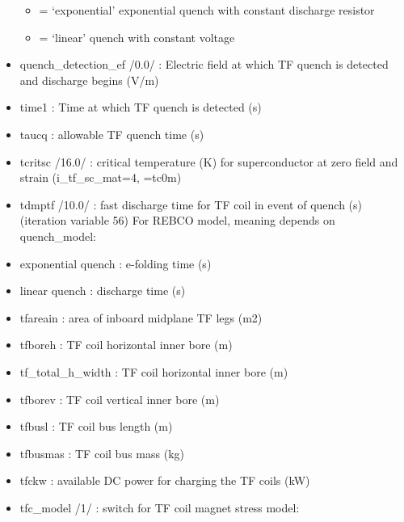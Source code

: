 \documentclass[]{article}
\providecommand{\tightlist}{%
  \setlength{\itemsep}{0pt}\setlength{\parskip}{0pt}}
\begin{document}
\begin{itemize}
  \begin{itemize}
  \tightlist
  \item
    = `exponential' exponential quench with constant discharge resistor
  \item
    = `linear' quench with constant voltage
  \end{itemize}
\item
  quench\_detection\_ef /0.0/ : Electric field at which TF quench is
  detected and discharge begins (V/m)
\item
  time1 : Time at which TF quench is detected (s)
\item
  taucq : allowable TF quench time (s)
\item
  tcritsc /16.0/ : critical temperature (K) for superconductor at zero
  field and strain (i\_tf\_sc\_mat=4, =tc0m)
\item
  tdmptf /10.0/ : fast discharge time for TF coil in event of quench (s)
  (iteration variable 56) For REBCO model, meaning depends on
  quench\_model:
\item
  exponential quench : e-folding time (s)
\item
  linear quench : discharge time (s)
\item
  tfareain : area of inboard midplane TF legs (m2)
\item
  tfboreh : TF coil horizontal inner bore (m)
\item
  tf\_total\_h\_width : TF coil horizontal inner bore (m)
\item
  tfborev : TF coil vertical inner bore (m)
\item
  tfbusl : TF coil bus length (m)
\item
  tfbusmas : TF coil bus mass (kg)
\item
  tfckw : available DC power for charging the TF coils (kW)
\item
  tfc\_model /1/ : switch for TF coil magnet stress model:


\end{itemize}
\end{document}

